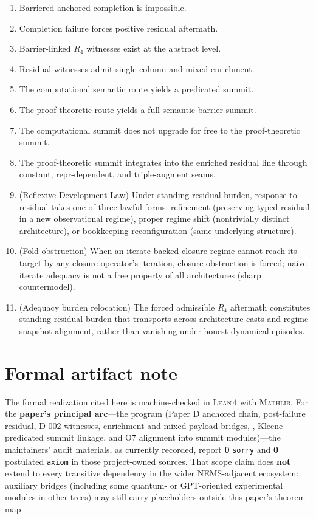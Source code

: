 \documentclass[11pt]{article}
\theoremstyle{plain}
\theoremstyle{definition}
\theoremstyle{remark}
\newcommand{\Lean}{\textsc{Lean\,4}}
\newcommand{\Mathlib}{\textsc{Mathlib}}
\begin{document}
\begin{enumerate}[label=\textbf{T\arabic*.}, leftmargin=2.2em]
\item Barriered anchored completion is impossible.
\item Completion failure forces positive residual aftermath.
\item Barrier-linked \(R_4\) witnesses exist at the abstract level.
\item Residual witnesses admit single-column and mixed enrichment.
\item The computational semantic route yields a predicated summit.
\item The proof-theoretic route yields a full semantic barrier summit.
\item The computational summit does not upgrade for free to the proof-theoretic summit.
\item The proof-theoretic summit integrates into the enriched residual line through constant, repr-dependent, and triple-augment seams.
\item (Reflexive Development Law) Under standing residual burden, response to residual takes one of three lawful forms: refinement (preserving typed residual in a new observational regime), proper regime shift (nontrivially distinct architecture), or bookkeeping reconfiguration (same underlying structure).
\item (Fold obstruction) When an iterate-backed closure regime cannot reach its target by any closure operator's iteration, closure obstruction is forced; naive iterate adequacy is not a free property of all architectures (sharp countermodel).
\item (Adequacy burden relocation) The forced admissible \(R_4\) aftermath constitutes standing residual burden that transports across architecture casts and regime-snapshot alignment, rather than vanishing under honest dynamical episodes.
\end{enumerate}

\section{Formal artifact note}

The formal realization cited here is machine-checked in \Lean{} with \Mathlib{}. For the \textbf{paper's principal arc}---the  program (Paper D anchored chain, post-failure residual, D-002 witnesses, enrichment and mixed payload bridges, , Kleene predicated summit linkage, and O7 alignment into  summit modules)---the maintainers' audit materials, as currently recorded, report \textbf{0} \texttt{sorry} and \textbf{0} postulated \texttt{axiom} in those project-owned sources. That scope claim does \textbf{not} extend to every transitive dependency in the wider NEMS-adjacent ecosystem: auxiliary bridges (including some quantum- or GPT-oriented experimental modules in other trees) may still carry placeholders outside this paper's theorem map.
\end{document}
